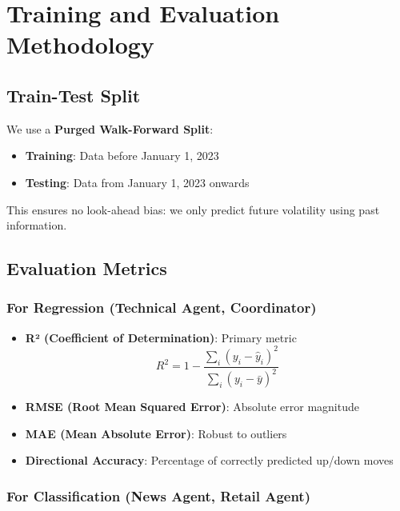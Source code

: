 \documentclass[12pt,a4paper]{article}
\begin{document}
\section{Training and Evaluation Methodology}

\subsection{Train-Test Split}

We use a \textbf{Purged Walk-Forward Split}:
\begin{itemize}
    \item \textbf{Training}: Data before January 1, 2023
    \item \textbf{Testing}: Data from January 1, 2023 onwards
\end{itemize}

This ensures no look-ahead bias: we only predict future volatility using past information.

\subsection{Evaluation Metrics}

\subsubsection{For Regression (Technical Agent, Coordinator)}

\begin{itemize}
    \item \textbf{R² (Coefficient of Determination)}: Primary metric
    \begin{equation}
        R^2 = 1 - \frac{\sum_i (y_i - \hat{y}_i)^2}{\sum_i (y_i - \bar{y})^2}
    \end{equation}
    \item \textbf{RMSE (Root Mean Squared Error)}: Absolute error magnitude
    \item \textbf{MAE (Mean Absolute Error)}: Robust to outliers
    \item \textbf{Directional Accuracy}: Percentage of correctly predicted up/down moves
\end{itemize}

\subsubsection{For Classification (News Agent, Retail Agent)}
\end{document}
